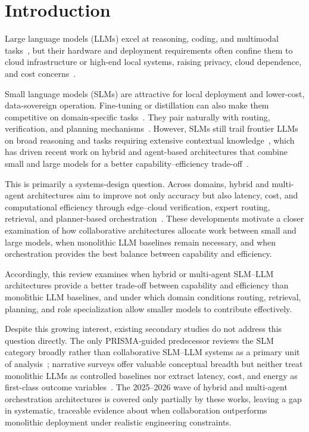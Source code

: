 \section{Introduction}

Large language models (LLMs) excel at reasoning, coding, and multimodal tasks~\cite{olfactory2025,staticanalysis2025,egi2025}, but their hardware and deployment requirements often confine them to cloud infrastructure or high-end local systems, raising privacy, cloud dependence, and cost concerns~\cite{energytoken2025,qwqrouting2025,tigani2025cpu,aydin2025integrated}.

Small language models (SLMs) are attractive for local deployment and lower-cost, data-sovereign operation. Fine-tuning or distillation can also make them competitive on domain-specific tasks~\cite{xie2025fusing,zhu2024distilling,rethinkllm2025}. They pair naturally with routing, verification, and planning mechanisms~\cite{aydin2025integrated,qwqrouting2025,ji2025raprag}. However, SLMs still trail frontier LLMs on broad reasoning and tasks requiring extensive contextual knowledge~\cite{egi2025,dorfner2024comparing}, which has driven recent work on hybrid and agent-based architectures that combine small and large models for a better capability--efficiency trade-off~\cite{hao2024hybrid,shao2025dot,multiagent2025}.

This is primarily a systems-design question. Across domains, hybrid and multi-agent architectures aim to improve not only accuracy but also latency, cost, and computational efficiency through edge--cloud verification, expert routing, retrieval, and planner-based orchestration~\cite{hao2024hybrid,lee2024orchestrallm,alabbasi2024teleoracle,ji2025raprag,chatzistefanidis2025symbiotic,han2025chest,energytoken2025}. These developments motivate a closer examination of how collaborative architectures allocate work between small and large models, when monolithic LLM baselines remain necessary, and when orchestration provides the best balance between capability and efficiency.

Accordingly, this review examines when hybrid or multi-agent SLM--LLM architectures provide a better trade-off between capability and efficiency than monolithic LLM baselines, and under which domain conditions routing, retrieval, planning, and role specialization allow smaller models to contribute effectively.

Despite this growing interest, existing secondary studies do not address this question directly. The only PRISMA-guided predecessor reviews the SLM category broadly rather than collaborative SLM--LLM systems as a primary unit of analysis~\cite{slmreview2025prisma}; narrative surveys offer valuable conceptual breadth but neither treat monolithic LLMs as controlled baselines nor extract latency, cost, and energy as first-class outcome variables~\cite{wang2024slmsurvey,chen2025collabmech,wang2025collabperf}. The 2025--2026 wave of hybrid and multi-agent orchestration architectures is covered only partially by these works, leaving a gap in systematic, traceable evidence about when collaboration outperforms monolithic deployment under realistic engineering constraints.

